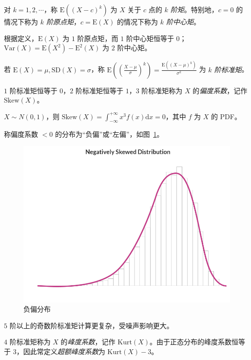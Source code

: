 \documentclass[../main.tex]{subfiles}
\begin{document}
\begin{definition}\label{def:4.5.1}
    对 $k=1,2,\cdots$，称 $\mathrm E((X-c)^k)$ 为 $X$ 关于 $c$ 点的 \emph{$k$ 阶矩}。特别地，$c=0$ 的情况下称为 \emph{$k$ 阶原点矩}，$c=\mathrm E(X)$ 的情况下称为 \emph{$k$ 阶中心矩}。
\end{definition}

根据定义，$\mathrm E(X)$ 为 $1$ 阶原点矩，而 $1$ 阶中心矩恒等于 $0$；$\mathrm{Var}(X)=\mathrm E(X^2)-\mathrm E^2(X)$ 为 $2$ 阶中心矩。

若 $\mathrm E(X)=\mu,\mathrm{SD}(X)=\sigma$，称 $\mathrm E((\frac{X-\mu}\sigma)^k)=\frac{\mathrm E((X-\mu)^k)}{\sigma^k}$ 为 \emph{$k$ 阶标准矩}。

$1$ 阶标准矩恒等于 $0$，$2$ 阶标准矩恒等于 $1$，$3$ 阶标准矩称为 $X$ 的\emph{偏度系数}，记作 $\mathrm{Skew}(X)$。

\begin{example}
    $X\sim N(0,1)$，则 $\mathrm{Skew}(X)=\int_{-\infty}^{+\infty}x^3f(x)\mathrm dx=0$，其中 $f$ 为 $X$ 的 PDF。
\end{example}

称偏度系数 $<0$ 的分布为“负偏”或“左偏”，如图~\ref{fig:4.5.1}。

\begin{figure}[!ht]
    \centering
    \includegraphics[scale=0.2]{figures/negative_skew.png}
    \caption{负偏分布}
    \label{fig:4.5.1}
\end{figure}

$5$ 阶以上的奇数阶标准矩计算更复杂，受噪声影响更大。

$4$ 阶标准矩称为 $X$ 的\emph{峰度系数}，记作 $\mathrm{Kurt}(X)$。由于正态分布的峰度系数恒等于 $3$，因此常定义\emph{超额峰度系数}为 $\mathrm{Kurt}(X)-3$。
\end{document}
